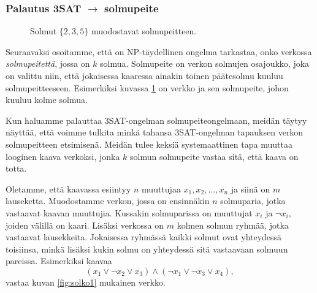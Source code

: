\subsubsection{Palautus 3SAT $\rightarrow$ solmupeite}


\begin{figure}
\center
\begin{center}
\end{center}
\caption{Solmut $\{2,3,5\}$ muodostavat solmupeitteen.}
\label{fig:solpei}
\end{figure}

Seuraavaksi osoitamme, että on NP-täydellinen ongelma tarkastaa,
onko verkossa \emph{solmupeitettä}, jossa on $k$ solmua.
Solmupeite on verkon solmujen osa\-joukko, joka on valittu niin,
että jokaisessa kaaressa ainakin toinen pääte\-solmu kuuluu
solmupeitteeseen.
Esimerkiksi kuvassa \ref{fig:solpei} on verkko ja sen solmupeite,
johon kuuluu kolme solmua.

Kun haluamme palauttaa 3SAT-ongelman solmupeiteongelmaan,
meidän täytyy näyttää, että voimme tulkita minkä tahansa
3SAT-ongelman tapauksen verkon solmupeitteen etsimisenä.
Meidän tulee keksiä systemaattinen tapa
muuttaa looginen kaava verkoksi,
jonka $k$ solmun solmupeite vastaa sitä, että kaava on totta.

Oletamme, että kaavassa esiintyy $n$ muuttujaa $x_1,x_2,\dots,x_n$
ja siinä on $m$ lauseketta.
Muodostamme verkon, jossa on ensinnäkin $n$ solmuparia,
jotka vastaavat kaavan muuttujia.
Kussakin solmuparissa on muuttujat $x_i$ ja $\neg x_i$,
joiden välillä on kaari.
Lisäksi verkossa on $m$ kolmen solmun ryhmää,
jotka vastaavat lausekkeita.
Jokaisessa ryhmässä kaikki solmut ovat yhteydessä toisiinsa,
minkä lisäksi kukin solmu on yhteydessä sitä vastaavaan solmuun pareissa.
Esimerkiksi kaavaa
\[(x_1 \lor \neg x_2 \lor x_3) \land (\neg x_1 \lor \neg x_3 \lor x_4),\]
vastaa kuvan \ref{fig:solko1} mukainen verkko.

